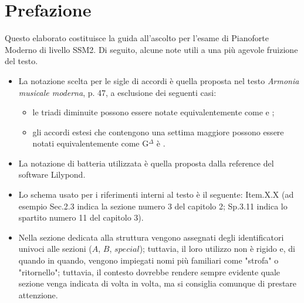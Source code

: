 \documentclass[class=book, crop=false, oneside, 12pt]{standalone}
\begin{document}
\chapter*{Prefazione}
Questo elaborato costituisce la guida all'ascolto per l'esame di Pianoforte Moderno di livello SSM2. Di seguito, alcune note utili a una più agevole fruizione del testo.

\begin{itemize}
    \item La notazione scelta per le sigle di accordi è quella proposta nel testo \emph{Armonia musicale moderna}, p. 47, a esclusione dei seguenti casi:
    \begin{itemize}
        \item le triadi diminuite possono essere notate equivalentemente come  e ;
        \item gli accordi estesi che contengono una settima maggiore possono essere notati equivalentemente come G\(^\Delta\) è .
    \end{itemize}
    \item La notazione di batteria utilizzata è quella proposta dalla reference del software Lilypond\cite{res:lily-drum-chart}.
    \item Lo schema usato per i riferimenti interni al testo è il seguente: Item.X.X (ad esempio Sec.2.3 indica la sezione numero 3 del capitolo 2; Sp.3.11 indica lo spartito numero 11 del capitolo 3).
    \item Nella sezione dedicata alla struttura vengono assegnati degli identificatori univoci alle sezioni (\(A\), \(B\), \(special\)); tuttavia, il loro utilizzo non è rigido e, di quando in quando, vengono impiegati nomi più familiari come "strofa" o "ritornello"; tuttavia, il contesto dovrebbe rendere sempre evidente quale sezione venga indicata di volta in volta, ma si consiglia comunque di prestare attenzione.
\end{itemize}
\end{document}
